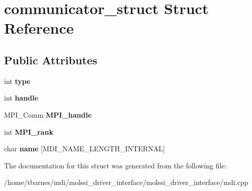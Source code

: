 \hypertarget{structcommunicator__struct}{\section{communicator\-\_\-struct Struct Reference}
\label{structcommunicator__struct}
}
\subsection*{Public Attributes}
\begin{DoxyCompactItemize}
\item 
\hypertarget{structcommunicator__struct_a0c9df913dafd6858581dab0cffd54a89}{int {\bfseries type}}\label{structcommunicator__struct_a0c9df913dafd6858581dab0cffd54a89}

\item 
\hypertarget{structcommunicator__struct_a93b2925f34f7610fd9d97fb6e7a439c9}{int {\bfseries handle}}\label{structcommunicator__struct_a93b2925f34f7610fd9d97fb6e7a439c9}

\item 
\hypertarget{structcommunicator__struct_aa79e48db3b6e63fbb39e6d43e41c752d}{M\-P\-I\-\_\-\-Comm {\bfseries M\-P\-I\-\_\-handle}}\label{structcommunicator__struct_aa79e48db3b6e63fbb39e6d43e41c752d}

\item 
\hypertarget{structcommunicator__struct_ad9e1362c930e8c07d7d9ff2e18cfa9b3}{int {\bfseries M\-P\-I\-\_\-rank}}\label{structcommunicator__struct_ad9e1362c930e8c07d7d9ff2e18cfa9b3}

\item 
\hypertarget{structcommunicator__struct_a8e4a395e54b77f82d50cb0fb1ee96c06}{char {\bfseries name} \mbox{[}M\-D\-I\-\_\-\-N\-A\-M\-E\-\_\-\-L\-E\-N\-G\-T\-H\-\_\-\-I\-N\-T\-E\-R\-N\-A\-L\mbox{]}}\label{structcommunicator__struct_a8e4a395e54b77f82d50cb0fb1ee96c06}

\end{DoxyCompactItemize}


The documentation for this struct was generated from the following file\-:\begin{DoxyCompactItemize}
\item 
/home/tbarnes/mdi/molssi\-\_\-driver\-\_\-interface/molssi\-\_\-driver\-\_\-interface/mdi.\-cpp\end{DoxyCompactItemize}
